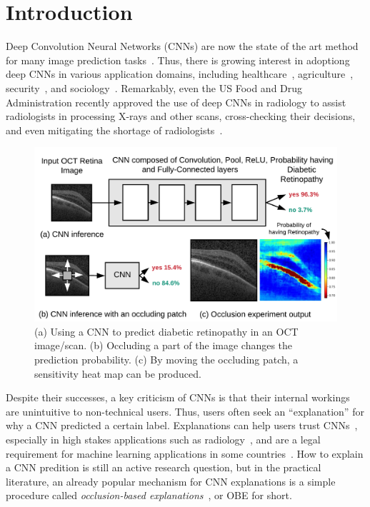 \section{Introduction}
Deep Convolution Neural Networks (CNNs) are now the state of the art method for many image prediction tasks~\cite{imagenet}. Thus, there is growing interest in adoptiong deep CNNs in various application domains, including healthcare~\cite{kermany2018identifying, islam2017abnormality}, agriculture~\cite{mohanty2016using}, security~\cite{arbabzadah2016identifying}, and sociology~\cite{wang2017deep}. Remarkably, even the US Food and Drug Administration recently approved the use of deep CNNs in radiology to assist radiologists in processing X-rays and other scans, cross-checking their decisions, and even mitigating the shortage of radiologists~\cite{fdaretinopathy,radiologistshortage}.


\begin{figure}[t]
\includegraphics[width=\columnwidth]{./images/krypton_overview}
\vspace{-6mm}
\caption{(a) Using a CNN to predict diabetic retinopathy in an OCT image/scan. (b) Occluding a part of the image changes the prediction probability. (c) By moving the occluding patch, a sensitivity heat map can be produced.}
\label{fig:krypton_overview}
\end{figure}

Despite their successes, a key criticism of CNNs is that their internal workings are unintuitive to non-technical users. Thus, users often seek an ``explanation'' for why a CNN predicted a certain label. Explanations can help users trust CNNs~\cite{lime}, especially in high stakes applications such as radiology~\cite{jung2017deep}, and are a legal requirement for machine learning applications in some countries~\cite{GDPR}. How to explain a CNN predition is still an active research question, but in the practical literature, an already popular mechanism for CNN explanations is a simple procedure called \textit{occlusion-based explanations}~\cite{zeiler2014visualizing}, or OBE for short.

